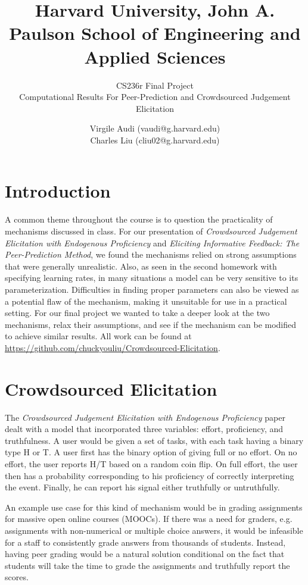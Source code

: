 \documentclass{scrartcl}
\title{Harvard University, John A. Paulson School of Engineering and Applied Sciences \newline}
\subtitle{CS236r Final Project\\ Computational Results For Peer-Prediction and Crowdsourced Judgement Elicitation}
\author{Virgile Audi (vaudi@g.harvard.edu)\\
		Charles Liu (cliu02@g.harvard.edu)}
\begin{document}
 
\maketitle
\section*{Introduction}

A common theme throughout the course is to question the practicality of mechanisms discussed in class. For our presentation of \emph{Crowdsourced Judgement Elicitation with Endogenous Proficiency} and \emph{Eliciting Informative Feedback: The Peer-Prediction Method}, we found the mechanisms relied on strong assumptions that were generally unrealistic. Also, as seen in the second homework with specifying learning rates, in many situations a model can be very sensitive to its parameterization. Difficulties in finding proper parameters can also be viewed as a potential flaw of the mechanism, making it unsuitable for use in a practical setting. For our final project we wanted to take a deeper look at the two mechanisms, relax their assumptions, and see if the mechanism can be modified to achieve similar results. All work can be found at \url{https://github.com/chuckyouliu/Crowdsourced-Elicitation}.

\section{Crowdsourced Elicitation}

The \emph{Crowdsourced Judgement Elicitation with Endogenous Proficiency} paper dealt with a model that incorporated three variables: effort, proficiency, and truthfulness. A user would be given a set of tasks, with each task having a binary type H or T. A user first has the binary option of giving full or no effort. On no effort, the user reports H/T based on a random coin flip. On full effort, the user then has a probability corresponding to his proficiency of correctly interpreting the event. Finally, he can report his signal either truthfully or untruthfully. 

An example use case for this kind of mechanism would be in grading assignments for massive open online courses (MOOCs). If there was a need for graders, e.g. assignments with non-numerical or multiple choice answers, it would be infeasible for a staff to consistently grade answers from thousands of students. Instead, having peer grading would be a natural solution conditional on the fact that students will take the time to grade the assignments and truthfully report the scores.
\end{document}
